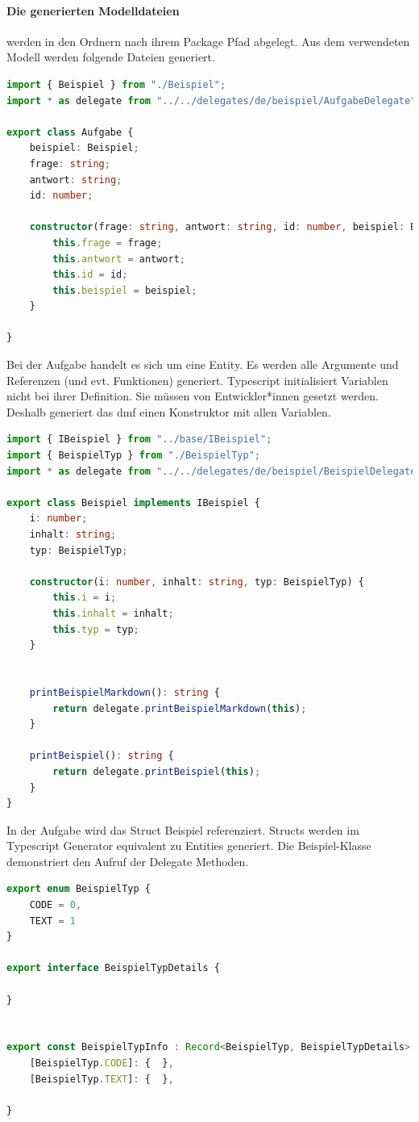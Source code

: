 \documentclass[./einleitung.tex]{subfiles}
\begin{document}
    \paragraph{Die generierten Modelldateien} werden in den Ordnern nach ihrem Package Pfad abgelegt.
    Aus dem verwendeten Modell werden folgende Dateien generiert.
    \begin{lstlisting}[language=Typescript,caption=Aufgabe.ts, label=lst:aufgabeTs]
import { Beispiel } from "./Beispiel";
import * as delegate from "../../delegates/de/beispiel/AufgabeDelegate";

export class Aufgabe {
    beispiel: Beispiel;
    frage: string;
    antwort: string;
    id: number;

    constructor(frage: string, antwort: string, id: number, beispiel: Beispiel) {
        this.frage = frage;
        this.antwort = antwort;
        this.id = id;
        this.beispiel = beispiel;
    }

}
    \end{lstlisting}
    Bei der Aufgabe handelt es sich um eine Entity.
    Es werden alle Argumente und Referenzen (und evt. Funktionen) generiert.
    Typescript initialisiert Variablen nicht bei ihrer Definition.
    Sie müssen von Entwickler*innen gesetzt werden.
    Deshalb generiert das \acrshort{dmf} einen Konstruktor mit allen Variablen.
    \begin{lstlisting}[language=Typescript, caption=Beispiel.ts, label=lst:beispielTs]
import { IBeispiel } from "../base/IBeispiel";
import { BeispielTyp } from "./BeispielTyp";
import * as delegate from "../../delegates/de/beispiel/BeispielDelegate";

export class Beispiel implements IBeispiel {
    i: number;
    inhalt: string;
    typ: BeispielTyp;

    constructor(i: number, inhalt: string, typ: BeispielTyp) {
        this.i = i;
        this.inhalt = inhalt;
        this.typ = typ;
    }


    printBeispielMarkdown(): string {
        return delegate.printBeispielMarkdown(this);
    }

    printBeispiel(): string {
        return delegate.printBeispiel(this);
    }
}
    \end{lstlisting}
    In der Aufgabe wird das Struct Beispiel referenziert.
    Structs werden im Typescript Generator equivalent zu Entities generiert.
    Die Beispiel-Klasse demonstriert den Aufruf der Delegate Methoden.
    \begin{lstlisting}[language=Typescript, caption=BeispielTyp.ts, label=lst:beispielTypTs]
export enum BeispielTyp {
    CODE = 0,
    TEXT = 1
}

export interface BeispielTypDetails {

}


export const BeispielTypInfo : Record<BeispielTyp, BeispielTypDetails> = {
    [BeispielTyp.CODE]: {  },
    [BeispielTyp.TEXT]: {  },

}
    \end{lstlisting}
\end{document}
